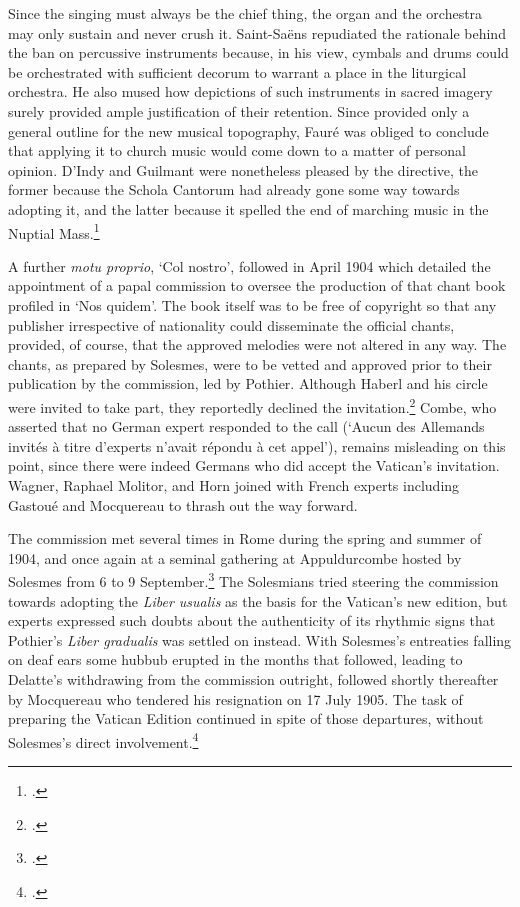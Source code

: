   {\cite[\S{}\S{}15--16]{Trasollecitudini22}}
{Since the singing must always be the chief thing, the organ and the orchestra may only sustain and never crush it.}
  {\cite[228--9]{HayburnPapalLegislationSacred1979}}
\noindent
Saint-Saëns repudiated the rationale behind the ban on percussive instruments because, in his view, cymbals and drums could be orchestrated with sufficient decorum to warrant a place in the liturgical orchestra.
He also mused how depictions of such instruments in sacred imagery surely provided ample justification of their retention.
Since \tls{} provided only a general outline for the new musical topography, Fauré was obliged to conclude that applying it to church music would come down to a matter of personal opinion.
D'Indy and Guilmant were nonetheless pleased by the directive, the former because the Schola Cantorum had already gone some way towards adopting it, and the latter because it spelled the end of marching music in the Nuptial Mass.\footcite[183--4]{MurisMotupropriomusique1904}

A further \emph{motu proprio}, `Col nostro', followed in April 1904 which detailed the appointment of a papal commission to oversee the production of that chant book profiled in `Nos quidem'.
The book itself was to be free of copyright so that any publisher irrespective of nationality could disseminate the official chants, provided, of course, that the approved melodies were not altered in any way.
The chants, as prepared by Solesmes, were to be vetted and approved prior to their publication by the commission, led by Pothier.
Although Haberl and his circle were invited to take part, they reportedly declined the invitation.\footnote{\cites[318]{CombeHistoirerestaurationchant1969}[285]{CombeRestorationGregorianChant2003}.}
Combe, who asserted that no German expert responded to the call (`Aucun des Allemands invités à titre d'experts n'avait répondu à cet appel'), remains misleading on this point, since there were indeed Germans who did accept the Vatican's invitation.
Wagner, Raphael Molitor, and Horn joined with French experts including Gastoué and Mocquereau to thrash out the way forward.

The commission met several times in Rome during the spring and summer of 1904, and once again at a seminal gathering at Appuldurcombe hosted by Solesmes from 6 to 9 September.\footcite[256--60]{HayburnPapalLegislationSacred1979}
The Solesmians tried steering the commission towards adopting the \emph{Liber usualis} as the basis for the Vatican's new edition, but experts expressed such doubts about the authenticity of its rhythmic signs that Pothier's \emph{Liber gradualis} was settled on instead.
With Solesmes's entreaties falling on deaf ears some hubbub erupted in the months that followed, leading to Delatte's withdrawing from the commission outright, followed shortly thereafter by Mocquereau who tendered his resignation on 17 July 1905.
The task of preparing the Vatican Edition continued in spite of those departures, without Solesmes's direct involvement.\footcite[109--111]{EllisPoliticsPlainchantfindesiecle2013}

